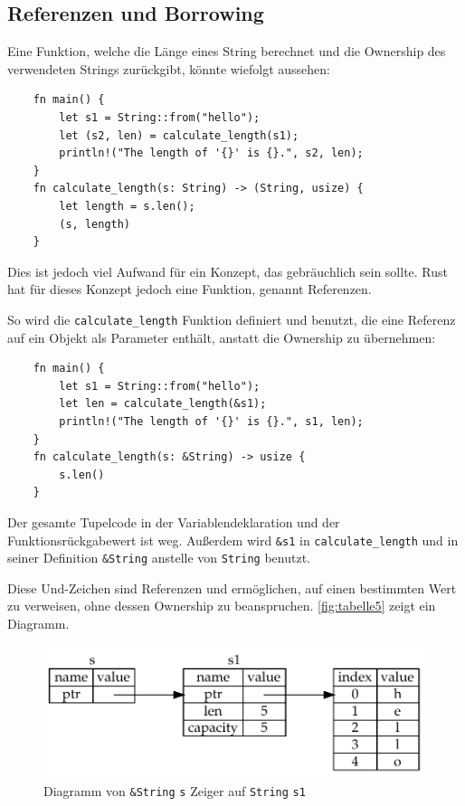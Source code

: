 \subsection{Referenzen und Borrowing}

Eine Funktion, welche die Länge eines String berechnet und die Ownership des verwendeten Strings zurückgibt, könnte wiefolgt aussehen:

\begin{lstlisting}
    fn main() {
        let s1 = String::from("hello");
        let (s2, len) = calculate_length(s1);
        println!("The length of '{}' is {}.", s2, len);
    }
    fn calculate_length(s: String) -> (String, usize) {
        let length = s.len();
        (s, length)
    }
\end{lstlisting}

Dies ist jedoch viel Aufwand für ein Konzept, das gebräuchlich sein sollte. Rust hat für dieses Konzept jedoch eine Funktion, genannt Referenzen.

So wird die \verb"calculate_length" Funktion definiert und benutzt, die eine Referenz auf ein Objekt als Parameter enthält, anstatt die Ownership zu übernehmen:

\begin{lstlisting}
    fn main() {
        let s1 = String::from("hello");
        let len = calculate_length(&s1);
        println!("The length of '{}' is {}.", s1, len);
    }
    fn calculate_length(s: &String) -> usize {
        s.len()
    }
\end{lstlisting}

Der gesamte Tupelcode in der Variablendeklaration und der Funk\-ti\-ons\-rück\-ga\-be\-wert ist weg. Außerdem wird \verb"&s1" in \verb"calculate_length" und in seiner Definition \verb"&String" anstelle von \verb"String" benutzt.

Diese Und-Zeichen sind Referenzen und ermöglichen, auf einen bestimmten Wert zu verweisen, ohne dessen Ownership zu beanspruchen. \autoref{fig:tabelle5} zeigt ein Diagramm.

\begin{figure}[htbp]
    \centering
    \includegraphics[scale=0.9]{Programmierung/Tabelle5.pdf}
    \caption{Diagramm von \texttt{\&String} \texttt{s} Zeiger auf \texttt{String} \texttt{s1}}
    \label{fig:tabelle5}
\end{figure}

